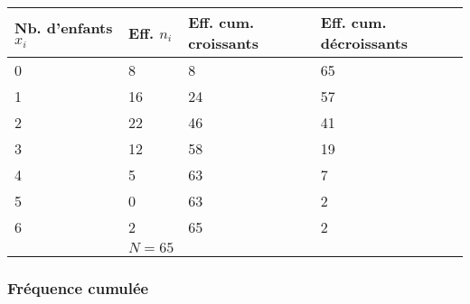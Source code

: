 \documentclass[a4paper,12pt]{scrartcl}
\begin{document}
\begin{center}
\begin{tabular}{l|l|ll}
\hline
\multicolumn{1}{|l|}{\textbf{Nb. d’enfants $x_i$}} & \textbf{Eff. $n_i$} & \multicolumn{1}{l|}{\textbf{Eff. cum. croissants}} & \multicolumn{1}{l|}{\textbf{Eff. cum. décroissants}} \\ \hline
\multicolumn{1}{|l|}{0}                            & 8                   & \multicolumn{1}{l|}{8}                                & \multicolumn{1}{l|}{65}                                 \\ \hline
\multicolumn{1}{|l|}{1}                            & 16                  & \multicolumn{1}{l|}{24}                               & \multicolumn{1}{l|}{57}                                 \\ \hline
\multicolumn{1}{|l|}{2}                            & 22                  & \multicolumn{1}{l|}{46}                               & \multicolumn{1}{l|}{41}                                 \\ \hline
\multicolumn{1}{|l|}{3}                            & 12                  & \multicolumn{1}{l|}{58}                               & \multicolumn{1}{l|}{19}                                 \\ \hline
\multicolumn{1}{|l|}{4}                            & 5                   & \multicolumn{1}{l|}{63}                               & \multicolumn{1}{l|}{7}                                  \\ \hline
\multicolumn{1}{|l|}{5}                            & 0                   & \multicolumn{1}{l|}{63}                               & \multicolumn{1}{l|}{2}                                  \\ \hline
\multicolumn{1}{|l|}{6}                            & 2                   & \multicolumn{1}{l|}{65}                               & \multicolumn{1}{l|}{2}                                  \\ \hline
                                                   & $N= 65$               &                                                       &                                                         \\ \cline{2-2}
\end{tabular}
\end{center}


\subsubsection{Fréquence cumulée}
\end{document}
